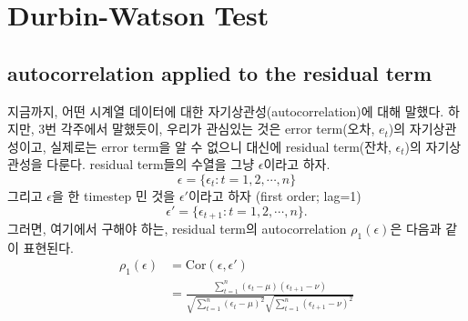 \documentclass{article}
\begin{document}
\section{Durbin-Watson Test}
\subsection{autocorrelation applied to the residual term}
지금까지, 어떤 시계열 데이터에 대한 자기상관성(autocorrelation)에 대해 말했다.
하지만, 3번 각주에서 말했듯이, 우리가 관심있는 것은 error term(오차, \(e_t\))의 자기상관성이고, 실제로는 error term을 알 수 없으니 대신에 residual term(잔차, \(\epsilon_t\))의 자기상관성을 다룬다.
residual term들의 수열을 그냥 \(\epsilon\)이라고 하자.
\[\epsilon=\{\epsilon_t:t=1,2,\cdots,n\}\]
그리고 \(\epsilon\)을 한 timestep 민 것을 \(\epsilon'\)이라고 하자 (first order; lag=1)
\[\epsilon'=\{\epsilon_{t+1}:t=1,2,\cdots,n\}.\]
그러면, 여기에서 구해야 하는, residual term의 autocorrelation \(\rho_1(\epsilon)\)은  다음과 같이 표현된다.
\begin{equation}\label{autocorrelation_of_residual}
\begin{aligned}
\rho_1(\epsilon)
&=\text{Cor}(\epsilon,\epsilon')\\
&=\frac{\sum_{t=1}^n(\epsilon_t-\mu)(\epsilon_{t+1}-\nu)}{\sqrt{\sum_{t=1}^n(\epsilon_t-\mu)^2}\sqrt{\sum_{t=1}^n(\epsilon_{t+1}-\nu)^2}}
\end{aligned}
\end{equation}

\end{document}
